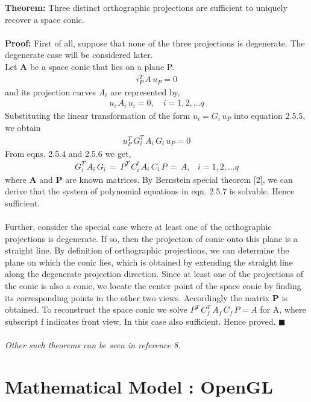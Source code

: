 \documentclass[
11pt, %
english, %
singlespacing, %
headsepline, %
]{MastersDoctoralThesis} %
\begin{document}
\textbf{Theorem: } Three distinct orthographic projections are sufficient to uniquely recover a space conic. \\ \\
\textbf{Proof: } First of all, suppose that none of the three projections is degenerate. The degenerate case will be considered later. \\Let \textbf{A} be a space conic that lies on a plane P.
\begin{align*} \textbf{$i_P^T\,A\,u_P$} = 0 \tag{2.5.4} \end{align*}
and its projection curves $A_i$ are represented by,
\begin{align*} \textbf{$u_i\,A_i\,u_i$} = 0, \,\,\,\,\,\, i = 1,2,...q \tag{2.5.5} \end{align*}
Substituting the linear transformation of the form $u_i = G_i \, u_P$ into equation 2.5.5, we obtain
\begin{align*} u_P^T\,G_i^T\,A_i\,G_i\,u_P = 0 \tag{2.5.6} \end{align*}
From eqns. 2.5.4 and 2.5.6 we get,
\begin{align*} G_i^T\,A_i\,G_i \, = \, P^T\,C_i^t\,A_i\,C_i\,P \, = \, A, \,\,\,\,\, i=1,2,...q \tag{2.5.7} \end{align*}
where \textbf{A} and \textbf{P} are known matrices. By Bernstein special theorem [2], we can derive that the system of polynomial equations in eqn. 2.5.7 is solvable. Hence sufficient. \\ \\
Further, consider the special case where at least one of the orthographic projections is degenerate. If so, then the projection of conic onto this plane is a straight line. By definition of orthographic projections, we can determine the plane on which the conic lies, which is obtained by extending the straight line along the degenerate projection direction. Since at least one of the projections of the conic is also a conic, we locate the center point of the space conic by finding its corresponding points in the other two views. Accordingly the matrix \textbf{P} is obtained. To reconstruct the space conic we solve $P^T\,C_f^T\,A_f\,C_f\,P = A$ for A, where subscript f indicates front view. In this case also sufficient. Hence proved.  $\blacksquare$
\\ \\
\emph{Other such theorems can be seen in reference 8.}

\chapter{Mathematical Model : OpenGL}
\end{document}
